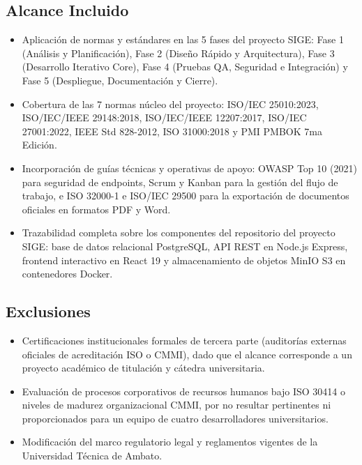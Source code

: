\documentclass[12pt,a4paper]{article}
\begin{document}
\subsection{Alcance Incluido}
\begin{itemize}[leftmargin=1.5em, itemsep=2pt]
    \item Aplicación de normas y estándares en las 5 fases del proyecto SIGE: Fase 1 (Análisis y Planificación), Fase 2 (Diseño Rápido y Arquitectura), Fase 3 (Desarrollo Iterativo Core), Fase 4 (Pruebas QA, Seguridad e Integración) y Fase 5 (Despliegue, Documentación y Cierre).
    \item Cobertura de las 7 normas núcleo del proyecto: ISO/IEC 25010:2023, ISO/IEC/IEEE 29148:2018, ISO/IEC/IEEE 12207:2017, ISO/IEC 27001:2022, IEEE Std 828-2012, ISO 31000:2018 y PMI PMBOK 7ma Edición.
    \item Incorporación de guías técnicas y operativas de apoyo: OWASP Top 10 (2021) para seguridad de endpoints, Scrum y Kanban para la gestión del flujo de trabajo, e ISO 32000-1 e ISO/IEC 29500 para la exportación de documentos oficiales en formatos PDF y Word.
    \item Trazabilidad completa sobre los componentes del repositorio del proyecto SIGE: base de datos relacional PostgreSQL, API REST en Node.js Express, frontend interactivo en React 19 y almacenamiento de objetos MinIO S3 en contenedores Docker.
\end{itemize}

\subsection{Exclusiones}
\begin{itemize}[leftmargin=1.5em, itemsep=2pt]
    \item Certificaciones institucionales formales de tercera parte (auditorías externas oficiales de acreditación ISO o CMMI), dado que el alcance corresponde a un proyecto académico de titulación y cátedra universitaria.
    \item Evaluación de procesos corporativos de recursos humanos bajo ISO 30414 o niveles de madurez organizacional CMMI, por no resultar pertinentes ni proporcionados para un equipo de cuatro desarrolladores universitarios.
    \item Modificación del marco regulatorio legal y reglamentos vigentes de la Universidad Técnica de Ambato.
\end{itemize}

\end{document}
